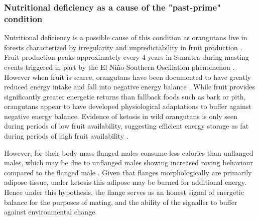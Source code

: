 \subsubsection{Nutritional deficiency as a cause of the "past-prime" condition}
Nutritional deficiency is a possible cause of this condition as orangutans live in forests characterized by irregularity and unpredictability in fruit production \citep{Morrogh-Bernard.2011}. Fruit production peaks approximately every 4 years in Sumatra during masting events triggered in part by the El Niño-Southern Oscillation phenomenon \citep{Wich.2000}. However when fruit is scarce, orangutans have been documented to have greatly reduced energy intake and fall into negative energy balance \citep{Erb.2018}. While fruit provides significantly greater energetic returns than fallback foods such as bark or pith, orangutans appear to have developed physiological adaptations to buffer against negative energy balance. Evidence of ketosis in wild orangutans is only seen during periods of low fruit availability, suggesting efficient energy storage as fat during periods of high fruit availability \citep{Erb.2018, Knott.1998}. 

However, for their body mass flanged males consume less calories than unflanged males, which may be due to unflanged males showing increased roving behaviour compared to the flanged male \citep{Vogel.2017}. Given that flanges morphologically are primarily adipose tissue, under ketosis this adipose may be burned for additional energy. Hence under this hypothesis, the flange serves as an honest signal of energetic balance for the purposes of mating, and the ability of the signaller to buffer against environmental change. 

